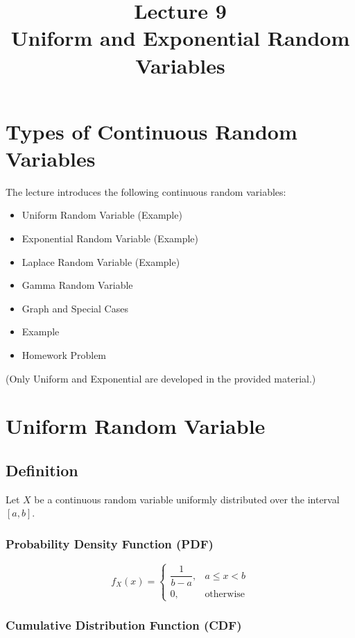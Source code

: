\documentclass[12pt]{article}
\title{Lecture 9 \\ Uniform and Exponential Random Variables}
\date{}
\begin{document}
\maketitle

\section{Types of Continuous Random Variables}

The lecture introduces the following continuous random variables:

\begin{itemize}
    \item Uniform Random Variable (Example)
    \item Exponential Random Variable (Example)
    \item Laplace Random Variable (Example)
    \item Gamma Random Variable
    \item Graph and Special Cases
    \item Example
    \item Homework Problem
\end{itemize}

(Only Uniform and Exponential are developed in the provided material.)

\section{Uniform Random Variable}

\subsection{Definition}

Let $X$ be a continuous random variable uniformly distributed over the interval $[a,b]$.

\subsubsection*{Probability Density Function (PDF)}

\[
f_X(x) =
\begin{cases}
\dfrac{1}{b-a}, & a \le x < b \\
0, & \text{otherwise}
\end{cases}
\]

\subsubsection*{Cumulative Distribution Function (CDF)}
\end{document}

